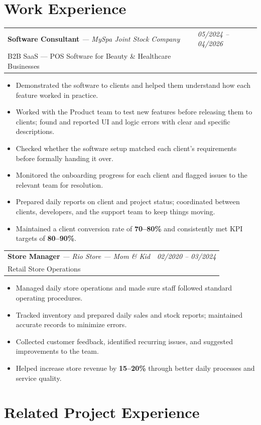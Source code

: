 \documentclass[a4paper,11pt]{article}
\newcommand{\resumeSubheading}[4]{
  \vspace{-1pt}\noindent
  \begin{tabularx}{\textwidth}{X >{\raggedleft\arraybackslash}p{4.2cm}}
    \textbf{#1} \textit{\small --- #2} & \textit{\small #3} \\
    \small #4 & \\
  \end{tabularx}\vspace{-6pt}
}
\newcommand{\resumeItemListStart}{\begin{itemize}[leftmargin=0.2in, label=\textbullet, itemsep=1pt, parsep=0pt]}
\newcommand{\resumeItemListEnd}{\end{itemize}\vspace{-4pt}}
\newcommand{\resumeItem}[1]{\item\small{#1}}
\begin{document}
\section{Work Experience}

\resumeSubheading
  {Software Consultant}{MySpa Joint Stock Company}{05/2024 -- 04/2026}
  {B2B SaaS --- POS Software for Beauty \& Healthcare Businesses}

\resumeItemListStart
  \resumeItem{Demonstrated the software to clients and helped them understand how each feature worked in practice.}
  \resumeItem{Worked with the Product team to test new features before releasing them to clients; found and reported UI and logic errors with clear and specific descriptions.}
  \resumeItem{Checked whether the software setup matched each client's requirements before formally handing it over.}
  \resumeItem{Monitored the onboarding progress for each client and flagged issues to the relevant team for resolution.}
  \resumeItem{Prepared daily reports on client and project status; coordinated between clients, developers, and the support team to keep things moving.}
  \resumeItem{Maintained a client conversion rate of \textbf{70--80\%} and consistently met KPI targets of \textbf{80--90\%}.}
\resumeItemListEnd

\resumeSubheading
  {Store Manager}{Rio Store --- Mom \& Kid}{02/2020 -- 03/2024}
  {Retail Store Operations}

\resumeItemListStart
  \resumeItem{Managed daily store operations and made sure staff followed standard operating procedures.}
  \resumeItem{Tracked inventory and prepared daily sales and stock reports; maintained accurate records to minimize errors.}
  \resumeItem{Collected customer feedback, identified recurring issues, and suggested improvements to the team.}
  \resumeItem{Helped increase store revenue by \textbf{15--20\%} through better daily processes and service quality.}
\resumeItemListEnd

\section{Related Project Experience}
\end{document}
